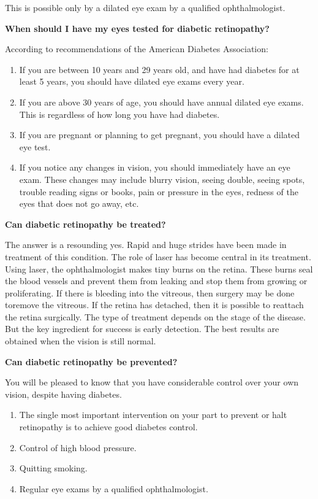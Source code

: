 This is possible only by a dilated eye exam by a qualified ophtha\-lmologist.

\noindent\textbf{When should I have my eyes tested for diabetic retinopathy?}

\noindent According to recommendations of the American Diabetes Association:

\begin{enumerate}[•]
\itemsep=0pt
\item If you are between 10 years and 29 years old, and have had diabetes for at least 5 years, you should have dilated eye exams every year.
\item If you are above 30 years of age, you should have annual dilated eye exams. This is regardless of how long you have had diabetes.
\item If you are pregnant or planning to get pregnant, you should have a dilated eye test.
\item If you notice any changes in vision, you should immediately have an eye exam. These changes may include blurry vision, seeing double, seeing spots, trouble reading signs or books, pain or pressure in the eyes, redness of the eyes that does not go away, etc.
\end{enumerate}

\noindent\textbf{Can diabetic retinopathy be treated?}

The answer is a resounding yes. Rapid and huge strides have been made in treatment of this condition. The role of laser has become central in its treatment. Using laser, the ophthalmologist makes tiny burns on the retina. These burns seal the blood vessels and prevent them from leaking and stop them from growing or proliferating. If there is bleeding into the vitreous, then surgery may be done to\break remove the vitreous. If the retina has detached, then it is possible to reattach the retina surgically. The type of treatment depends on the stage of the disease. But the key ingredient for success is early dete\-ction. The best results are obtained when the vision is still normal.

\noindent\textbf{Can diabetic retinopathy be prevented?}

You will be pleased to know that you have considerable control over your own vision, despite having diabetes.

\begin{enumerate}[•]
\itemsep=0pt
\item The single most important intervention on your part to prevent or halt retinopathy is to achieve good diabetes control.
\item Control of high blood pressure.
\item Quitting smoking.
\item Regular eye exams by a qualified ophthalmologist.
\end{enumerate}

